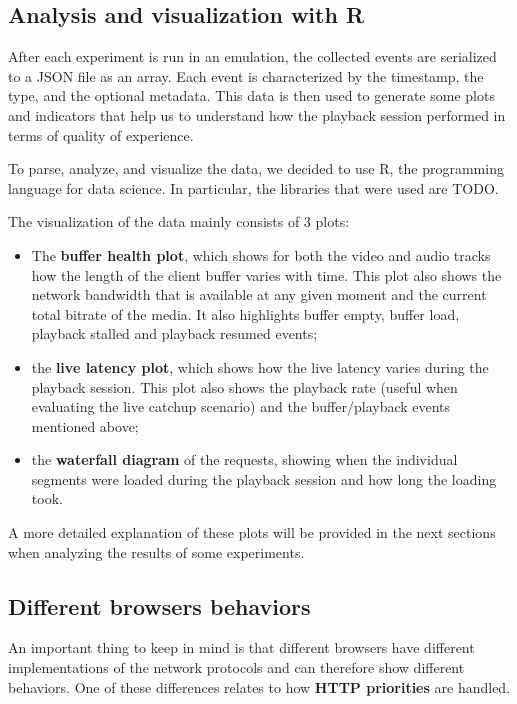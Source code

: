 \subsection{Analysis and visualization with R}
\label{sec:eval/testbed/dataviz}

After each experiment is run in an emulation, the collected events are serialized to a JSON file as an array. Each event is characterized by the timestamp, the type, and the optional metadata. This data is then used to generate some plots and indicators that help us to understand how the playback session performed in terms of quality of experience.

To parse, analyze, and visualize the data, we decided to use R, the programming language for data science. In particular, the libraries that were used are TODO.

The visualization of the data mainly consists of 3 plots:

\begin{itemize}
    \item The \textbf{buffer health plot}, which shows for both the video and audio tracks how the length of the client buffer varies with time. This plot also shows the network bandwidth that is available at any given moment and the current total bitrate of the media. It also highlights buffer empty, buffer load, playback stalled and playback resumed events;
    \item the \textbf{live latency plot}, which shows how the live latency varies during the playback session. This plot also shows the playback rate (useful when evaluating the live catchup scenario) and the buffer/playback events mentioned above;
    \item the \textbf{waterfall diagram} of the requests, showing when the individual segments were loaded during the playback session and how long the loading took.
\end{itemize}

A more detailed explanation of these plots will be provided in the next sections when analyzing the results of some experiments.

\subsection{Different browsers behaviors}
\label{sec:eval/browsers}

An important thing to keep in mind is that different browsers have different implementations of the network protocols and can therefore show different behaviors. One of these differences relates to how \textbf{HTTP priorities} are handled.

